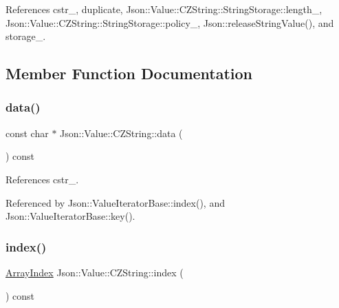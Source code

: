 References cstr\+\_\+, duplicate, Json\+::\+Value\+::\+C\+Z\+String\+::\+String\+Storage\+::length\+\_\+, Json\+::\+Value\+::\+C\+Z\+String\+::\+String\+Storage\+::policy\+\_\+, Json\+::release\+String\+Value(), and storage\+\_\+.



\subsection{Member Function Documentation}
\mbox{\label{classJson_1_1Value_1_1CZString_af6eee54f8dc43a1203d5af6ba0a5c9a2_af6eee54f8dc43a1203d5af6ba0a5c9a2}} 
\subsubsection{\texorpdfstring{data()}{data()}}
{\footnotesize\ttfamily const char $\ast$ Json\+::\+Value\+::\+C\+Z\+String\+::data (\begin{DoxyParamCaption}{ }\end{DoxyParamCaption}) const}



References cstr\+\_\+.



Referenced by Json\+::\+Value\+Iterator\+Base\+::index(), and Json\+::\+Value\+Iterator\+Base\+::key().

\mbox{\label{classJson_1_1Value_1_1CZString_a0f3ba09401525d4f01dafd577122ee32_a0f3ba09401525d4f01dafd577122ee32}} 
\subsubsection{\texorpdfstring{index()}{index()}}
{\footnotesize\ttfamily \hyperlink{classJson_1_1Value_a184a91566cccca7b819240f0d5561c7d_a184a91566cccca7b819240f0d5561c7d}{Array\+Index} Json\+::\+Value\+::\+C\+Z\+String\+::index (\begin{DoxyParamCaption}{ }\end{DoxyParamCaption}) const}



